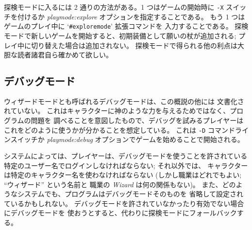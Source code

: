 探検モードに入るには 2 通りの方法がある。1 つはゲームの開始時に
{\tt -X} スイッチを付けるか
{\it playmode:explore\/}
オプションを指定することである。
もう 1 つはゲームのプレイ中に `{\tt \#exploremode}' 拡張コマンドを
入力することである。
探検モードで新しいゲームを開始すると、初期装備として願いの杖が追加される;
プレイ中に切り替えた場合は追加されない。
探検モードで得られる他の利点は大胆な読者諸君自ら確かめて欲しい。

\subsection*{デバッグモード}

ウィザードモードとも呼ばれるデバッグモードは、この概説の他には
文書化されていない。
これはキャラクターに神のような力を与えるためではなく、プログラムの問題を
調べることを意図したもので、デバッグを試みるプレイヤーは
これをどのように使うかが分かることを想定している。
これは
{\tt -D}
コマンドラインスイッチか
{\it playmode:debug\/}
オプションでゲームを始めることで開始される。

システムによっては、プレイヤーは、デバッグモードを使うことを許されている
特定のユーザー名でログインしなければならない; それ以外では、
キャラクターは特定のキャラクター名を使わなければならない
(しかし職業はどれでもよい; ``ウィザード'' という名前と
職業の {\it Wizard\/} は何の関係もない)。
また、どのようなシステムでも、プログラムはデバッグモードそのものを
省略して設定されているかもしれない。
デバッグモードを許されていなかったり有効でない場合にデバッグモードを
使おうとすると、代わりに探検モードにフォールバックする。


